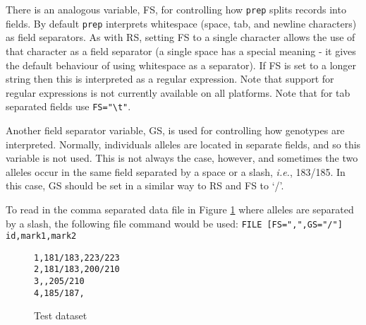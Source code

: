 \documentclass[10pt,a4paper]{article}
\newcommand{\IE}{\textit{i.e.},\xspace}
\newcommand{\Prep}{\texttt{prep}\xspace}
\begin{document}
There is an analogous variable, FS, for controlling how \Prep splits records
into fields.  By default \Prep interprets whitespace (space, tab, and
newline characters) as field separators.  As with RS, setting FS to a single
character allows the use of that character as a field separator (a single
space has a special meaning - it gives the default behaviour of using
whitespace as a separator).  If FS is set to a longer string then this is
interpreted as a regular expression.  Note that support for regular
expressions is not currently available on all platforms.  Note that for tab
separated fields use \verb+FS="\t"+.

Another field separator variable, GS, is used for controlling how genotypes
are interpreted.  Normally, individuals alleles are located in separate
fields, and so this variable is not used.  This is not always the case,
however, and sometimes the two alleles occur in the same field separated by
a space or a slash, \IE 183/185.  In this case, GS should be set in a
similar way to RS and FS to `/'.  

To read in the comma separated data file in Figure \ref{fig:2a} where alleles are
separated by a slash, the following file command would be used:
\verb+FILE [FS=",",GS="/"] id,mark1,mark2+
\begin{figure}
\caption{\label{fig:2a}Test dataset}
\begin{verbatim}
1,181/183,223/223
2,181/183,200/210
3,,205/210
4,185/187,
\end{verbatim}
\end{figure}
\end{document}

